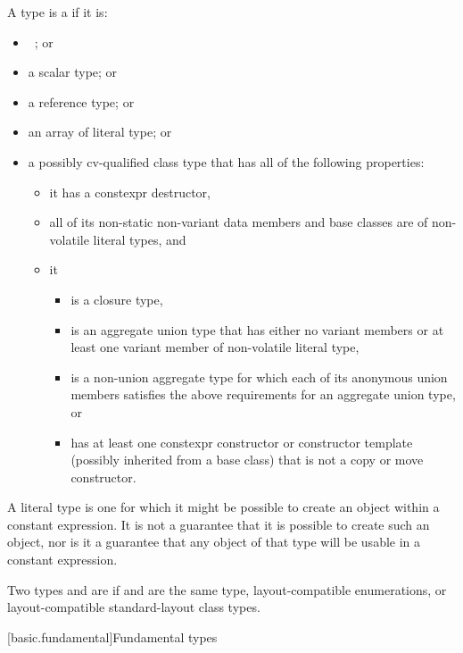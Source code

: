 \pnum
\label{term.literal.type}%
A type is a  if it is:
\begin{itemize}
\item \cv{}~; or
\item a scalar type; or
\item a reference type; or
\item an array of literal type; or
\item a possibly cv-qualified class type that
has all of the following properties:
\begin{itemize}
\item it has a constexpr destructor,
\item all of its non-static non-variant data members and base classes are of non-volatile literal types, and
\item it
\begin{itemize}
\item is a closure type,
\item is an aggregate union type that has either
no variant members or
at least one variant member of non-volatile literal type,
\item is a non-union aggregate type for which
each of its anonymous union members
satisfies the above requirements for an aggregate union type, or
\item has at least one constexpr constructor or constructor template
(possibly inherited from a base class)
that is not a copy or move constructor.
\end{itemize}
\end{itemize}
\end{itemize}
\begin{note}
A literal type is one for which
it might be possible to create an object
within a constant expression.
It is not a guarantee that it is possible to create such an object,
nor is it a guarantee that any object of that type
will be usable in a constant expression.
\end{note}

\pnum
\label{term.layout.compatible.type}%
Two types   and   are
if  and  are the same type,
layout-compatible enumerations, or
layout-compatible standard-layout class types.

[basic.fundamental]{Fundamental types}

